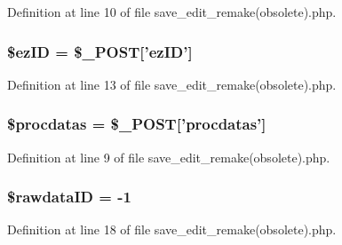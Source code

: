 Definition at line 10 of file save\-\_\-edit\-\_\-remake(obsolete).\-php.

\hypertarget{save__edit__remake_07obsolete_08_8php_addb1ec3ba55e413a08cb006ce21974df}{
\subsubsection[{\$ez\-I\-D}]{\setlength{\rightskip}{0pt plus 5cm}\${\bf ez\-I\-D} = \$\-\_\-\-P\-O\-S\-T\mbox{[}'{\bf ez\-I\-D}'\mbox{]}}}\label{save__edit__remake_07obsolete_08_8php_addb1ec3ba55e413a08cb006ce21974df}


Definition at line 13 of file save\-\_\-edit\-\_\-remake(obsolete).\-php.

\hypertarget{save__edit__remake_07obsolete_08_8php_a5a756a18d8cc040338f041ca8f8c3666}{
\subsubsection[{\$procdatas}]{\setlength{\rightskip}{0pt plus 5cm}\$procdatas = \$\-\_\-\-P\-O\-S\-T\mbox{[}'procdatas'\mbox{]}}}\label{save__edit__remake_07obsolete_08_8php_a5a756a18d8cc040338f041ca8f8c3666}


Definition at line 9 of file save\-\_\-edit\-\_\-remake(obsolete).\-php.

\hypertarget{save__edit__remake_07obsolete_08_8php_a7e1df84a3733bb1672c8485fa286658d}{
\subsubsection[{\$rawdata\-I\-D}]{\setlength{\rightskip}{0pt plus 5cm}\$rawdata\-I\-D = -\/1}}\label{save__edit__remake_07obsolete_08_8php_a7e1df84a3733bb1672c8485fa286658d}


Definition at line 18 of file save\-\_\-edit\-\_\-remake(obsolete).\-php.

